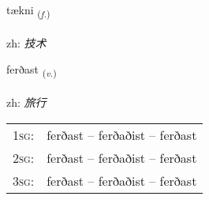 \documentclass[frontgrid, backgrid]{flacards}\usepackage[]{graphicx}\usepackage[]{color}
\begin{document}
\renewcommand{\flhead}{\vskip5pt \fboxsep=0pt {\small\bfseries\footnotesize Nafnorð | 名词}}
\renewcommand{\fcfoot}{\vskip5pt \fboxsep=0pt \hspace{2pt}{\small\bfseries\footnotesize 2K}}

\renewcommand{\blhead}{\vskip5pt {\small\bfseries\footnotesize Nafnorð | 名词 }}
\renewcommand{\bcfoot}{\vskip5pt \hspace{2pt}{\small\bfseries\footnotesize 2K}}


{tækni \small{\textsubscript{(\textit{f.})}} \\[1ex] %
\textphonetic{[tʰaihknɪ]} \\
zh: \emph{技术} \\  [2ex]
\renewcommand*{\arraystretch}{0.8}
}

\renewcommand{\flhead}{\vskip5pt \fboxsep=0pt {\small\bfseries\footnotesize Sagnorð | 动词}}
\renewcommand{\fcfoot}{\vskip5pt \fboxsep=0pt \hspace{2pt}{\small\bfseries\footnotesize 2K}}

\renewcommand{\blhead}{\vskip5pt {\small\bfseries\footnotesize Sagnorð | 动词 }}
\renewcommand{\bcfoot}{\vskip5pt \hspace{2pt}{\small\bfseries\footnotesize 2K}}


{ferðast \small{\textsubscript{(\textit{v.})}} \\[1ex] %
\textphonetic{[fɛrðast]} \\
zh: \emph{旅行} \\  [2ex]
\renewcommand*{\arraystretch}{0.8}
\begin{tabular}{p{1cm}l}
\textsc{1sg}: & ferðast -- ferðaðist -- ferðast \\ 
\textsc{2sg}: & ferðast -- ferðaðist -- ferðast \\ 
\textsc{3sg}: & ferðast -- ferðaðist -- ferðast \\ 
\end{tabular}
}
\end{document}
